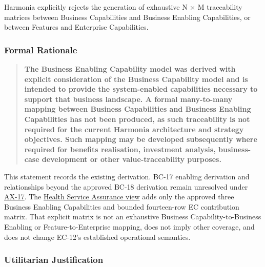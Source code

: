 Harmonia explicitly rejects the generation of exhaustive N × M traceability matrices between Business Capabilities and Business Enabling Capabilities, or between Features and Enterprise Capabilities.

\label{rad:tier-model:260}
\subsubsection*{Formal Rationale}
\label{rad:tier-model:262}

\begin{quote}

\textbf{The Business Enabling Capability model was derived with explicit consideration of the Business Capability model and is intended to provide the system-enabled capabilities necessary to support that business landscape. A formal many-to-many mapping between Business Capabilities and Business Enabling Capabilities has not been produced, as such traceability is not required for the current Harmonia architecture and strategy objectives. Such mapping may be developed subsequently where required for benefits realisation, investment analysis, business-case development or other value-traceability purposes.}


\end{quote}
\label{rad:tier-model:264}

This statement records the existing derivation. BC-17 enabling derivation and relationships beyond the approved BC-18 derivation remain unresolved under \href{https://github.com/fhirfactory/harmonia/blob/98410db60155198a75f74c79d98060070209faa1/docs/markdown/governance/architectural-axioms.md\#ax-17}{AX-17}. The \hyperref[rad:assurance-strategy]{Health Service Assurance view} adds only the approved three Business Enabling Capabilities and bounded fourteen-row EC contribution matrix. That explicit matrix is not an exhaustive Business Capability-to-Business Enabling or Feature-to-Enterprise mapping, does not imply other coverage, and does not change EC-12's established operational semantics.

\label{rad:tier-model:266}
\subsubsection*{Utilitarian Justification}
\label{rad:tier-model:267}

